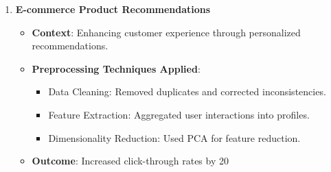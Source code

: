 \documentclass[aspectratio=169]{beamer}
\begin{document}
\begin{frame}[fragile]
\begin{enumerate}
        \item \textbf{E-commerce Product Recommendations}
            \begin{itemize}
                \item \textbf{Context}: Enhancing customer experience through personalized recommendations.
                \item \textbf{Preprocessing Techniques Applied}:
                    \begin{itemize}
                        \item Data Cleaning: Removed duplicates and corrected inconsistencies.
                        \item Feature Extraction: Aggregated user interactions into profiles.
                        \item Dimensionality Reduction: Used PCA for feature reduction.
                    \end{itemize}
                \item \textbf{Outcome}: Increased click-through rates by 20%
            \end{itemize}
    \end{enumerate}
\end{frame}
\end{document}
